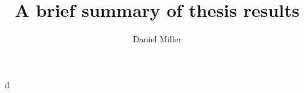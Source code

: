 \documentclass{article}
\title{A brief summary of thesis results}
\author{Daniel Miller}
\begin{document}
\maketitle





d
\end{document}
